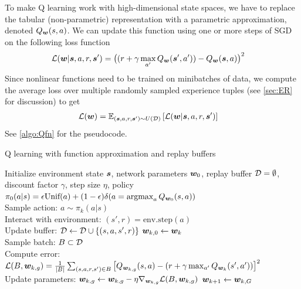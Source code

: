 To make Q learning work with high-dimensional state spaces,
we have to replace the tabular (non-parametric) representation
with a parametric approximation, denoted $Q_{\vw}(s,a)$.
We can update this function using one or more steps of SGD
on the following loss function
\begin{align}
  \loss(\vw|\vs,a,r,\vs') &=
  \big( (r + \gamma \max_{a'} Q_{\vw}(\vs',a')) -   Q_{\vw}(\vs,a) \big)^2  
  \label{eqn:ynaive}
\end{align}
Since nonlinear functions need to be trained on minibatches
of data, we compute the average loss over multiple
randomly sampled
experience tuples (see \cref{sec:ER} for discussion)
  to get
  \begin{align}
\loss(\vw) &= \expectQ{\loss(\vw|\vs,a,r,\vs')}{(\vs,a,r,\vs') \sim U(\data)}
  \end{align}
See \cref{algo:Qfn} for the pseudocode.


\begin{algorithm}
\dontprintsemicolon
\caption{Q learning with function approximation and replay buffers}
\label{algo:Qfn}
Initialize environment state $\vs$,
network parameters $\vw_0$,
replay buffer $\data=\emptyset$,
discount factor $\gamma$,
step size $\eta$,
policy
$\pi_0(a|s) = \epsilon \text{Unif}(a)
+ (1-\epsilon) \delta(a=\argmax_a Q_{\vw_0}(s,a))$ \\
    {
          {
            Sample action: $a \sim \pi_k(a|s)$ \\
            Interact with environment: $(s',r) = \text{env.step}(a)$ \\
            Update buffer: $\data \leftarrow \data \union \{ (s,a,s',r) \}$ 
          }
          $\vw_{k,0} \leftarrow \vw_k$ \\
              {
                Sample batch: $B \subset \data$ \\
                Compute error: $\loss(B,\vw_{k,g})
                = \frac{1}{|B|} \sum_{(s,a,r,s') \in B}
                \left[ Q_{\vw_{k,g}}(s,a) - (r + \gamma \max_{a'} Q_{\vw_k}(s',a')) \right]^2$\\
                Update parameters:
                $\vw_{k,g} \leftarrow \vw_{k,g} - \lr \nabla_{\vw_{k,g}}
                \loss(B,\vw_{k,g})$
              }
         $\vw_{k+1} \leftarrow \vw_{k,G}$ 
      }
\end{algorithm}

